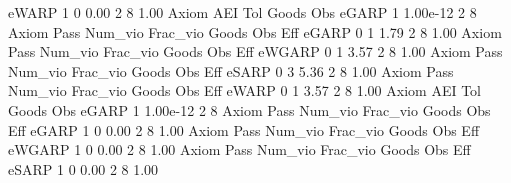        eWARP {\VBAR}    1           0        0.00           2           8        1.00  
{\smallskip}
       Axiom {\VBAR}       AEI        Tol      Goods        Obs 
       eGARP {\VBAR}         1   1.00e-12          2          8 
{\smallskip}
{\smallskip}
{\smallskip}
       Axiom {\VBAR} Pass     Num_vio    Frac_vio       Goods         Obs         Eff  
       eGARP {\VBAR}    0           1        1.79           2           8        1.00  
{\smallskip}
{\smallskip}
{\smallskip}
       Axiom {\VBAR} Pass     Num_vio    Frac_vio       Goods         Obs         Eff  
      eWGARP {\VBAR}    0           1        3.57           2           8        1.00  
{\smallskip}
{\smallskip}
{\smallskip}
       Axiom {\VBAR} Pass     Num_vio    Frac_vio       Goods         Obs         Eff  
       eSARP {\VBAR}    0           3        5.36           2           8        1.00  
{\smallskip}
{\smallskip}
{\smallskip}
       Axiom {\VBAR} Pass     Num_vio    Frac_vio       Goods         Obs         Eff  
       eWARP {\VBAR}    0           1        3.57           2           8        1.00  
{\smallskip}
       Axiom {\VBAR}       AEI        Tol      Goods        Obs 
       eGARP {\VBAR}         1   1.00e-12          2          8 
{\smallskip}
{\smallskip}
{\smallskip}
       Axiom {\VBAR} Pass     Num_vio    Frac_vio       Goods         Obs         Eff  
       eGARP {\VBAR}    1           0        0.00           2           8        1.00  
{\smallskip}
{\smallskip}
{\smallskip}
       Axiom {\VBAR} Pass     Num_vio    Frac_vio       Goods         Obs         Eff  
      eWGARP {\VBAR}    1           0        0.00           2           8        1.00  
{\smallskip}
{\smallskip}
{\smallskip}
       Axiom {\VBAR} Pass     Num_vio    Frac_vio       Goods         Obs         Eff  
       eSARP {\VBAR}    1           0        0.00           2           8        1.00  
{\smallskip}
{\smallskip}
{\smallskip}
